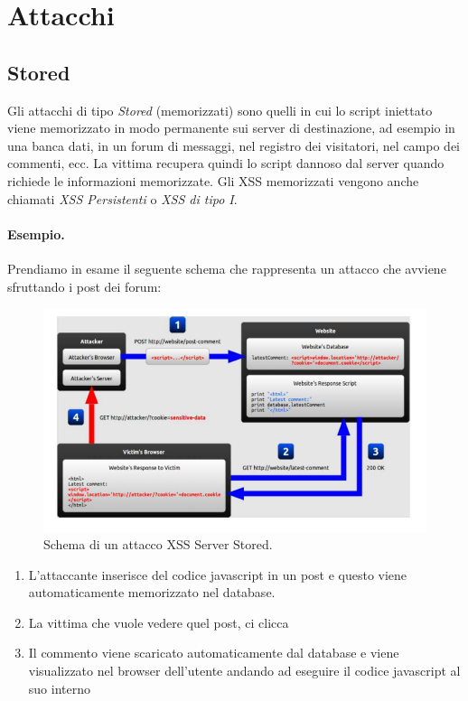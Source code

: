 \section{Attacchi}

\subsection{Stored}

Gli attacchi di tipo \textit{Stored} (memorizzati) sono quelli in cui lo
script iniettato viene memorizzato in
modo permanente sui server di destinazione, ad esempio in una banca dati,
in un forum di
messaggi, nel registro dei visitatori, nel campo dei commenti, ecc.
La vittima recupera quindi lo script dannoso dal server quando richiede le
informazioni memorizzate.
Gli XSS memorizzati vengono anche chiamati \textit{XSS Persistenti} o
\textit{XSS di tipo I}.

\paragraph{Esempio.}
Prendiamo in esame il seguente schema che rappresenta un attacco che avviene
sfruttando i post dei forum:

\begin{figure}[H]
      \centering
      \includegraphics[width=\textwidth, keepaspectratio]{capitoli/secure_coding/img/cap_9/stored.png}
      \caption{Schema di un attacco XSS Server Stored.}
\end{figure}

\begin{enumerate}
      \item L'attaccante inserisce del codice javascript in un post e questo viene
            automaticamente memorizzato nel database.
      \item La vittima che vuole vedere quel post, ci clicca
      \item Il commento viene scaricato automaticamente dal database e viene
            visualizzato nel browser dell'utente andando ad eseguire il codice
            javascript al suo interno
\end{enumerate}

